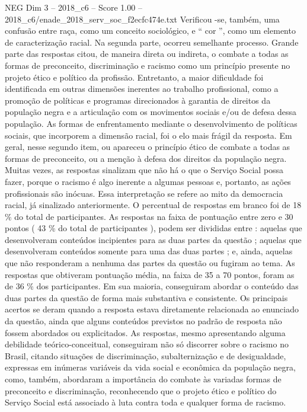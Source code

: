 \begin{textsample}{NEG Dim 3 – 2018\_c6 – Score 1.00 – 2018\_c6/enade\_2018\_serv\_soc\_f2ecfc474e.txt}
Verificou -se, também, uma confusão entre raça, como um conceito sociológico, e “ cor ”, como um elemento de caracterização racial.
Na segunda parte, ocorreu semelhante processo.
Grande parte das respostas citou, de maneira direta ou indireta, o combate a todas as formas de preconceito, discriminação e racismo como um princípio presente no projeto ético e político da profissão.
Entretanto, a maior dificuldade foi identificada em outras dimensões inerentes ao trabalho profissional, como a promoção de políticas e programas direcionados à garantia de direitos da população negra e a articulação com os movimentos sociais e/ou de defesa dessa população.
As formas de enfrentamento mediante o desenvolvimento de políticas sociais, que incorporem a dimensão racial, foi o elo mais frágil da resposta.
Em geral, nesse segundo item, ou apareceu o princípio ético de combate a todas as formas de preconceito, ou a menção à defesa dos direitos da população negra.
Muitas vezes, as respostas sinalizam que não há o que o Serviço Social possa fazer, porque o racismo é algo inerente a algumas pessoas e, portanto, as ações profissionais são inócuas.
Essa interpretação se refere ao mito da democracia racial, já sinalizado anteriormente.
O percentual de respostas em branco foi de 18 \% do total de participantes.
As respostas na faixa de pontuação entre zero e 30 pontos ( 43 \% do total de participantes ), podem ser divididas entre : aquelas que desenvolveram conteúdos incipientes para as duas partes da questão ; aquelas que desenvolveram conteúdos somente para uma das duas partes ; e, ainda, aquelas que não responderam a nenhuma das partes da questão ou fugiram ao tema.
As respostas que obtiveram pontuação média, na faixa de 35 a 70 pontos, foram as de 36 \% dos participantes.
Em sua maioria, conseguiram abordar o conteúdo das duas partes da questão de forma mais substantiva e consistente.
Os principais acertos se deram quando a resposta estava diretamente relacionada ao enunciado da questão, ainda que alguns conteúdos previstos no padrão de resposta não fossem abordados ou explicitados.
As respostas, mesmo apresentando alguma debilidade teórico-conceitual, conseguiram não só discorrer sobre o racismo no Brasil, citando situações de discriminação, subalternização e de desigualdade, expressas em inúmeras variáveis da vida social e econômica da população negra, como, também, abordaram a importância do combate às variadas formas de preconceito e discriminação, reconhecendo que o projeto ético e político do Serviço Social está associado à luta contra toda e qualquer forma de racismo.

\end{textsample}
